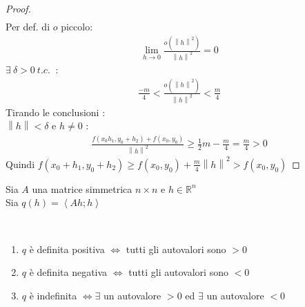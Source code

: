 \documentclass[a4paper, oneside]{article}
\begin{document}
\begin{proof}
\begin{gather*}
            \end{gather*}
            Per def. di $o$ piccolo:
            \begin{gather*}
                \lim_{h \to 0} \frac{o(\left\lVert h\right\rVert^2 )}{\left\lVert h\right\rVert^2 } = 0
            \end{gather*}
             $\exists \ \delta > 0 \ t.c. \ $  :\\
            \begin{gather*}
                \frac{-m}{4}< \frac{o(\left\lVert h\right\rVert^2 )}{\left\lVert h\right\rVert^2 } < \frac{m}{4}
            \end{gather*}
            Tirando le conclusioni :\\
             $\left\lVert h\right\rVert < \delta$ e $h \neq 0 $ :
            \begin{gather*}
                \frac{f(x_0h_1,y_0+h_2)+f(x_0,y_0)}{\left\lVert h\right\rVert^2 } \geq \frac{1}{2}m - \frac{m}{4} = \frac{m}{4} > 0
            \end{gather*}
            Quindi $f(x_0+h_1,y_0+h_2) \geq f(x_0,y_0) + \frac{m}{4} \left\lVert h\right\rVert^2 > f(x_0,y_0)$ 
        \end{proof}
        \begin{proposition}
            Sia $A$ una matrice simmetrica $n \times n$ e $h \in \mathbb{R}^n$\\
            Sia $q(h) = \left\langle Ah;h \right\rangle$ 
        \end{proposition}
        \begin{theorem}
            \hfil\\
            \begin{enumerate}[$i)$]
                \item $q$ è definita positiva $\Leftrightarrow$ tutti gli autovalori sono $>0$
                \item $q$ è definita negativa $\Leftrightarrow$ tutti gli autovalori sono $<0$
                \item $q$ è indefinita $\Leftrightarrow \exists$ un autovalore $>0$ ed $\exists$ un autovalore $<0$
            \end{enumerate}
        \end{theorem}
\end{document}
